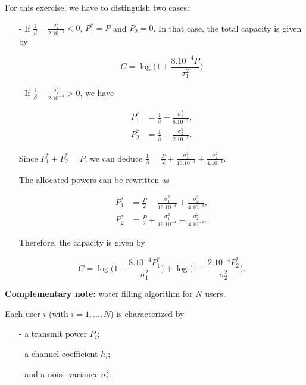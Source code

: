 \documentclass [a4paper, 11pt] {article}
\begin{document}
\begin{solution}
\begin{enumerate}
        For this exercise, we have to distinguish two cases:

        \begin{itemize}
            \item[-] If $\frac{1}{\beta} - \frac{\sigma_2^2}{2.10^{-4}} < 0$, $P_1^* = P$ and $P_2 = 0$. In that case, the total capacity is given by

            \begin{equation}
                C = \log\bigg(1 + \frac{8.10^{-4}P}{\sigma_1^2}\bigg)
            \end{equation}
            \item[-] If $\frac{1}{\beta} - \frac{\sigma_2^2}{2.10^{-4}} > 0$, we have

            \begin{align}
                P_1^* &= \frac{1}{\beta} - \frac{\sigma_1^2}{8.10^{-4}},\\
                P_2^* &= \frac{1}{\beta} - \frac{\sigma_2^2}{2.10^{-4}}.
            \end{align}

            Since $P_1^* + P_2^* = P$, we can deduce $\frac{1}{\beta} = \frac{P}{2} + \frac{\sigma_1^2}{16.10^{-4}} + \frac{\sigma_2^2}{4.10^{-4}}$.

            The allocated powers can be rewritten as

            \begin{align}
                P_1^* &= \frac{P}{2} - \frac{\sigma_1^2}{16.10^{-4}} + \frac{\sigma_2^2}{4.10^{-4}},\\
                P_2^* &= \frac{P}{2} + \frac{\sigma_1^2}{16.10^{-4}} - \frac{\sigma_2^2}{4.10^{-4}}.
            \end{align}

            Therefore, the capacity is given by

            \begin{equation}
                C = \log\bigg(1 + \frac{8.10^{-4}P_1^*}{\sigma_1^2}\bigg) + \log\bigg(1 + \frac{2.10^{-4}P_2^*}{\sigma_2^2}\bigg).
            \end{equation}

        \end{itemize}
        \end{enumerate}


        \textbf{Complementary note:} water filling algorithm for $N$ users.


        Each user $i$ (with $i = 1,\hdots,N$) is characterized by
        \begin{itemize}
            \item[-] a transmit power $P_i$;
            \item[-] a channel coefficient $h_i$;
            \item[-] and a noise variance $\sigma_i^2$.
        \end{itemize}


\end{solution}
\end{document}
